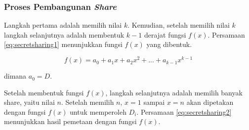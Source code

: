 \subsubsection{Proses Pembangunan \textit{Share}}

Langkah pertama adalah memilih nilai \begin{math}k\end{math}. Kemudian, setelah memilih nilai \begin{math}k\end{math} langkah selanjutnya adalah membentuk \begin{math}k-1\end{math} derajat fungsi \begin{math}f(x)\end{math}. Persamaan \ref{eq:secretsharing1} menunjukkan fungsi \begin{math}f(x)\end{math} yang dibentuk.

\begin{equation}
	f(x) = a_0 + a_1x + a_2x^2 + ... + a_{k-1}x^{k-1} \label{eq:secretsharing1}
\end{equation}

\begin{flushleft}
	dimana \begin{math}a_0 = D\end{math}.
\end{flushleft}

Setelah membentuk fungsi \begin{math}f(x)\end{math}, langkah selanjutnya adalah memilih banyak share, yaitu nilai \begin{math}n\end{math}. Setelah memilih \begin{math}n\end{math}, \begin{math}x=1\end{math} sampai \begin{math}x=n\end{math} akan dipetakan dengan fungsi \begin{math}f(x)\end{math} untuk memperoleh \begin{math}D_i\end{math}. Persamaan \ref{eq:secretsharing2} menunjukkan hasil pemetaan dengan fungsi \begin{math}f(x)\end{math}.

